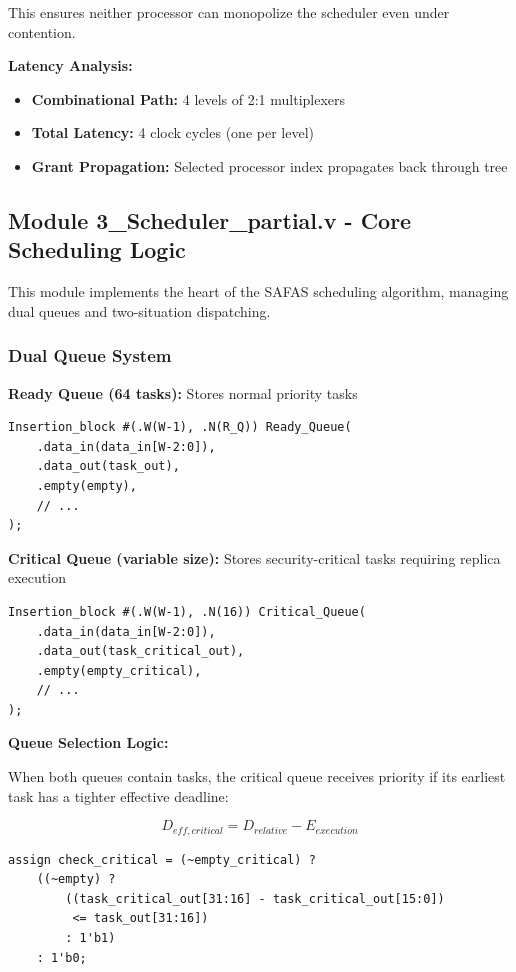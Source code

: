 \documentclass[12pt,a4paper]{article}
\begin{document}
This ensures neither processor can monopolize the scheduler even under contention.

\textbf{Latency Analysis:}
\begin{itemize}
    \item \textbf{Combinational Path:} 4 levels of 2:1 multiplexers
    \item \textbf{Total Latency:} 4 clock cycles (one per level)
    \item \textbf{Grant Propagation:} Selected processor index propagates back through tree
\end{itemize}

\subsection{Module 3\_Scheduler\_partial.v - Core Scheduling Logic}

This module implements the heart of the SAFAS scheduling algorithm, managing dual queues and two-situation dispatching.

\subsubsection{Dual Queue System}

\textbf{Ready Queue (64 tasks):} Stores normal priority tasks
\begin{lstlisting}[style=verilog]
Insertion_block #(.W(W-1), .N(R_Q)) Ready_Queue(
    .data_in(data_in[W-2:0]),
    .data_out(task_out),
    .empty(empty),
    // ...
);
\end{lstlisting}

\textbf{Critical Queue (variable size):} Stores security-critical tasks requiring replica execution
\begin{lstlisting}[style=verilog]
Insertion_block #(.W(W-1), .N(16)) Critical_Queue(
    .data_in(data_in[W-2:0]),
    .data_out(task_critical_out),
    .empty(empty_critical),
    // ...
);
\end{lstlisting}

\textbf{Queue Selection Logic:}

When both queues contain tasks, the critical queue receives priority if its earliest task has a tighter effective deadline:

\begin{equation}
D_{eff,critical} = D_{relative} - E_{execution}
\end{equation}

\begin{lstlisting}[style=verilog, caption={Critical Task Priority Logic}]
assign check_critical = (~empty_critical) ?
    ((~empty) ?
        ((task_critical_out[31:16] - task_critical_out[15:0])
         <= task_out[31:16])
        : 1'b1)
    : 1'b0;
\end{lstlisting}
\end{document}
